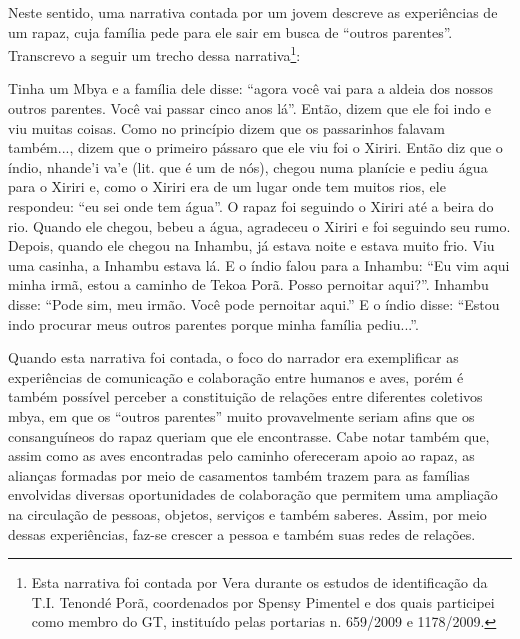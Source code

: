 \documentclass{article}
\begin{document}
Neste sentido, uma narrativa contada por um jovem descreve as
experi\^encias de um rapaz, cuja fam\'ilia pede para ele sair em busca
de {\textquotedblleft}outros parentes{\textquotedblright}. Transcrevo a
seguir um trecho dessa narrativa\footnote{ Esta narrativa foi contada
por Vera durante os estudos de identifica\c{c}\~ao da T.I. Tenond\'e
Por\~a, coordenados por Spensy Pimentel e dos quais participei como
membro do GT, institu\'ido pelas portarias n{\textordmasculine}.
659/2009 e 1178/2009.}: 

Tinha um Mbya e a fam\'ilia dele disse: {\textquotedblleft}agora voc\^e
vai para a aldeia dos nossos outros parentes. Voc\^e vai passar cinco
anos l\'a{\textquotedblright}. Ent\~ao, dizem que ele foi indo e viu
muitas coisas. Como no princ\'ipio dizem que os passarinhos falavam
tamb\'em..., dizem que o primeiro p\'assaro que ele viu foi o Xiriri.
Ent\~ao diz que o \'indio, nhande{\textquoteright}i
va{\textquoteright}e (lit. que \'e um de n\'os), chegou numa plan\'icie
e pediu \'agua para o Xiriri e, como o Xiriri era de um lugar onde tem
muitos rios, ele respondeu: {\textquotedblleft}eu sei onde tem
\'agua{\textquotedblright}. O rapaz foi seguindo o Xiriri at\'e a beira
do rio. Quando ele chegou, bebeu a \'agua, agradeceu o Xiriri e foi
seguindo seu rumo. Depois, quando ele chegou na Inhambu, j\'a estava
noite e estava muito frio. Viu uma casinha, a Inhambu estava l\'a. E o
\'indio falou para a Inhambu: {\textquotedblleft}Eu vim aqui minha
irm\~a, estou a caminho de Tekoa Por\~a. Posso pernoitar
aqui?{\textquotedblright}. Inhambu disse: {\textquotedblleft}Pode sim,
meu irm\~ao. Voc\^e pode pernoitar aqui.{\textquotedblright} E o
\'indio disse: {\textquotedblleft}Estou indo procurar meus outros
parentes porque minha fam\'ilia pediu...{\textquotedblright}. 

Quando esta narrativa foi contada, o foco do narrador era exemplificar
as experi\^encias de comunica\c{c}\~ao e colabora\c{c}\~ao entre
humanos e aves, por\'em \'e tamb\'em poss\'ivel perceber a
constitui\c{c}\~ao de rela\c{c}\~oes entre diferentes coletivos mbya,
em que os {\textquotedblleft}outros parentes{\textquotedblright} muito
provavelmente seriam afins que os consangu\'ineos do rapaz queriam que
ele encontrasse. Cabe notar tamb\'em que, assim como as aves
encontradas pelo caminho ofereceram apoio ao rapaz, as alian\c{c}as
formadas por meio de casamentos tamb\'em trazem para as fam\'ilias
envolvidas diversas oportunidades de colabora\c{c}\~ao que permitem uma
amplia\c{c}\~ao na circula\c{c}\~ao de pessoas, objetos, servi\c{c}os e
tamb\'em saberes. Assim, por meio dessas experi\^encias, faz-se crescer
a pessoa e tamb\'em suas redes de rela\c{c}\~oes.
\end{document}

